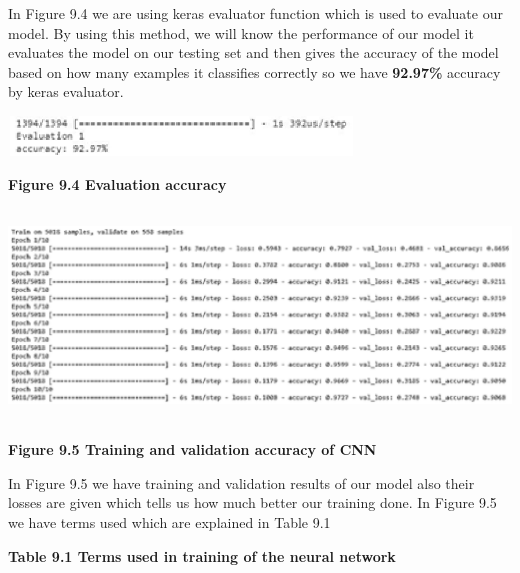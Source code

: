 \documentclass{article} %
\begin{document}
\noindent In Figure 9.4 we are using keras evaluator function which is used to evaluate our model. By using this method, we will know the performance of our model it evaluates the model on our testing set and then gives the accuracy of the model based on how many examples it classifies correctly so we have \textbf{92.97\%} accuracy by keras evaluator.

\noindent \includegraphics*[width=3.62in, height=0.42in, keepaspectratio=false]{image45}

\noindent \textbf{Figure 9.4 Evaluation accuracy}

\noindent \includegraphics*[width=6.25in, height=2.22in, keepaspectratio=false]{image46}

\noindent \textbf{Figure 9.5 Training and validation accuracy of CNN}

\noindent In Figure 9.5 we have training and validation results of our model also their losses are given which tells us how much better our training done. In Figure 9.5 we have terms used which are explained in Table 9.1

\noindent \textbf{Table 9.1 Terms used in training of the neural network}
\end{document}
